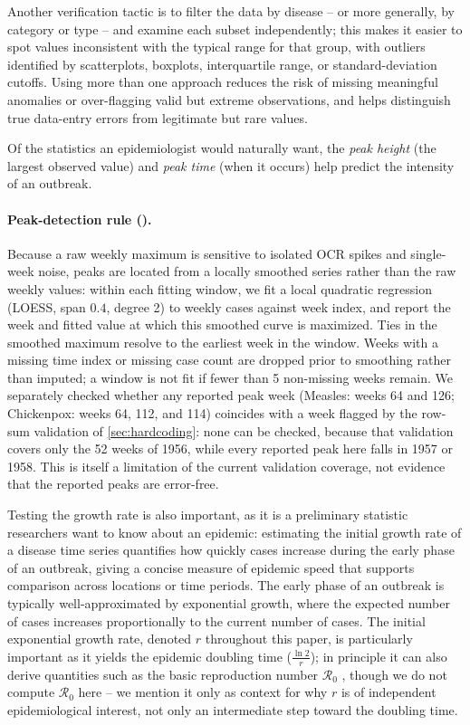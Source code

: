 \documentclass[12pt]{article}
\begin{document}
Another verification tactic is to filter the data by disease -- or more generally, by category or type -- and examine each subset independently; this makes it easier to spot values inconsistent with the typical range for that group, with outliers identified by scatterplots, boxplots, interquartile range, or standard-deviation cutoffs. Using more than one approach reduces the risk of missing meaningful anomalies or over-flagging valid but extreme observations, and helps distinguish true data-entry errors from legitimate but rare values.

Of the statistics an epidemiologist would naturally want, the \emph{peak height} (the largest observed value) and \emph{peak time} (when it occurs) help predict the intensity of an outbreak.

\paragraph{Peak-detection rule ().} Because a raw weekly maximum is sensitive to isolated OCR spikes and single-week noise, peaks are located from a locally smoothed series rather than the raw weekly values: within each fitting window, we fit a local quadratic regression (LOESS, span $0.4$, degree 2) to weekly cases against week index, and report the week and fitted value at which this smoothed curve is maximized. Ties in the smoothed maximum resolve to the earliest week in the window. Weeks with a missing time index or missing case count are dropped prior to smoothing rather than imputed; a window is not fit if fewer than 5 non-missing weeks remain. We separately checked whether any reported peak week (Measles: weeks 64 and 126; Chickenpox: weeks 64, 112, and 114) coincides with a week flagged by the row-sum validation of \cref{sec:hardcoding}: none can be checked, because that validation covers only the 52 weeks of 1956, while every reported peak here falls in 1957 or 1958. This is itself a limitation of the current validation coverage, not evidence that the reported peaks are error-free.

Testing the growth rate is also important, as it is a preliminary statistic researchers want to know about an epidemic: estimating the initial growth rate of a disease time series quantifies how quickly cases increase during the early phase of an outbreak, giving a concise measure of epidemic speed that supports comparison across locations or time periods. The early phase of an outbreak is typically well-approximated by exponential growth, where the expected number of cases increases proportionally to the current number of cases. The initial exponential growth rate, denoted $r$ throughout this paper, is particularly important as it yields the epidemic doubling time ($\frac{\ln{2}}{r}$); in principle it can also derive quantities such as the basic reproduction number $\mathcal{R}_0$ \cite{WallLips07}, though we do not compute $\mathcal{R}_0$ here -- we mention it only as context for why $r$ is of independent epidemiological interest, not only an intermediate step toward the doubling time.
\end{document}
